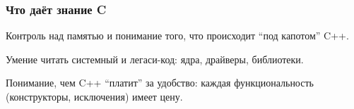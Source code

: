 \documentclass[compress, 8pt, aspectratio=169]{beamer}
\begin{document}
\begin{frame}

    \frametitle{Что даёт знание C}

    \begin{myitemize}

        \item Контроль над памятью и понимание того, что происходит
            \enquote{под капотом} C++.

        \item Умение читать системный и легаси-код: ядра,
            драйверы, библиотеки.

        \item Понимание, чем C++ \enquote{платит} за удобство: каждая
            функциональность (конструкторы, исключения) имеет цену.

    \end{myitemize}

\end{frame}
\end{document}
